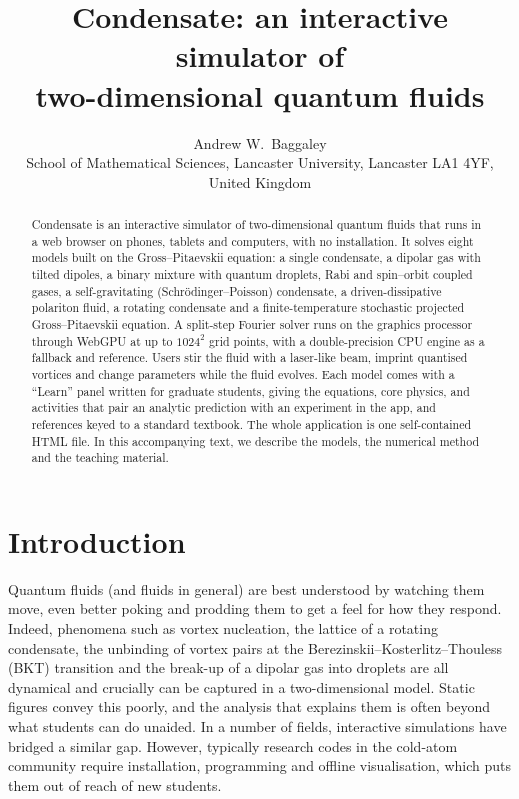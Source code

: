 \documentclass[11pt,a4paper]{article}
\title{\textbf{Condensate: an interactive simulator of\\ two-dimensional quantum fluids}}
\author{Andrew W.\ Baggaley\\[2pt]
\small School of Mathematical Sciences, Lancaster University, Lancaster LA1 4YF, United Kingdom}
\date{}
\begin{document}
\maketitle

\begin{abstract}
\noindent
Condensate is an interactive simulator of two-dimensional quantum fluids that runs in a web browser on phones, tablets and computers, with no installation. It solves eight models built on the Gross--Pitaevskii equation: a single condensate, a dipolar gas with tilted dipoles, a binary mixture with quantum droplets, Rabi and spin--orbit coupled gases, a self-gravitating (Schr\"odinger--Poisson) condensate, a driven-dissipative polariton fluid, a rotating condensate and a finite-temperature stochastic projected Gross--Pitaevskii equation. A split-step Fourier solver runs on the graphics processor through WebGPU at up to $1024^2$ grid points, with a double-precision CPU engine as a fallback and reference. Users stir the fluid with a laser-like beam, imprint quantised vortices and change parameters while the fluid evolves. Each model comes with a ``Learn'' panel written for graduate students, giving the equations, core physics, and activities that pair an analytic prediction with an experiment in the app, and references keyed to a standard textbook. The whole application is one self-contained HTML file. In this accompanying text, we describe the models, the numerical method and the teaching material.
\end{abstract}

\section{Introduction}

Quantum fluids (and fluids in general) are best understood by watching them move, even better poking and prodding them to get a feel for how they respond. Indeed, phenomena such as vortex nucleation, the lattice of a rotating condensate, the unbinding of vortex pairs at the Berezinskii--Kosterlitz--Thouless (BKT) transition and the break-up of a dipolar gas into droplets are all dynamical and crucially can be captured in a two-dimensional model. Static figures convey this poorly, and the analysis that explains them is often beyond what students can do unaided. In a number of fields, interactive simulations have bridged a similar gap. However, typically research codes in the cold-atom community require installation, programming and offline visualisation, which puts them out of reach of new students.
\end{document}
